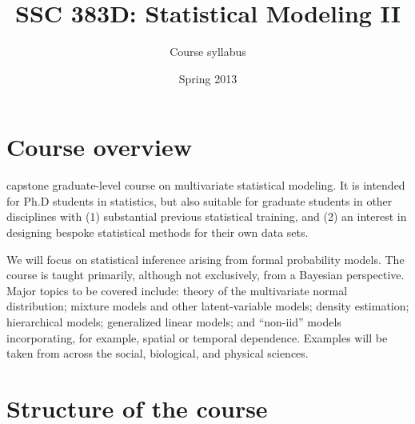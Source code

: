\documentclass{mynotes}
\title{SSC 383D: Statistical Modeling II}
\author{Course syllabus}
\date{Spring 2013}  %
\begin{document}
\maketitle%

\section{Course overview}



 capstone graduate-level course on multivariate statistical modeling.  It is intended for Ph.D students in statistics, but also suitable for graduate students in other disciplines with (1) substantial previous statistical training, and (2) an interest in designing bespoke statistical methods for their own data sets.

We will focus on statistical inference arising from formal probability models.  The course is taught primarily, although not exclusively, from a Bayesian perspective.  Major topics to be covered include: theory of the multivariate normal distribution; mixture models and other latent-variable models; density estimation; hierarchical models; generalized linear models; and ``non-iid'' models incorporating, for example, spatial or temporal dependence.  Examples will be taken from across the social, biological, and physical sciences.

\section{Structure of the course}
\end{document}
